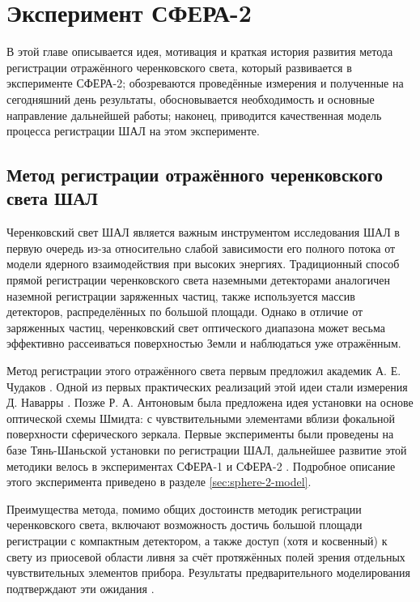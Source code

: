 \chapter{Эксперимент СФЕРА-2}

В этой главе описывается идея, мотивация и краткая история развития метода регистрации отражённого черенковского света, который развивается в эксперименте СФЕРА-2; обозреваются проведённые измерения и полученные на сегодняшний день результаты, обосновывается необходимость и основные направление дальнейшей работы; наконец, приводится качественная модель процесса регистрации ШАЛ на этом эксперименте.

\section{Метод регистрации отражённого черенковского света ШАЛ}

Черенковский свет ШАЛ является важным инструментом исследования ШАЛ в первую очередь из-за относительно слабой зависимости его полного потока от модели ядерного взаимодействия при высоких энергиях. Традиционный способ прямой регистрации черенковского света наземными детекторами аналогичен наземной регистрации заряженных частиц, также используется массив детекторов, распределённых по большой площади. Однако в отличие от заряженных частиц, черенковский свет оптического диапазона может весьма эффективно рассеиваться поверхностью Земли и наблюдаться уже отражённым.

Метод регистрации этого отражённого света первым предложил академик А. Е. Чудаков \cite{Чудаков1972}. Одной из первых практических реализаций этой идеи стали измерения Д. Наварры \cite{Navarra1981}. Позже Р. А. Антоновым была предложена идея установки на основе оптической схемы Шмидта: с чувствительными элементами вблизи фокальной поверхности сферического зеркала. Первые эксперименты были проведены на базе Тянь-Шаньской установки по регистрации ШАЛ, дальнейшее развитие этой методики велось в экспериментах СФЕРА-1 и СФЕРА-2 \cite{Antonov1997, Antonov2001}. Подробное описание этого эксперимента приведено в разделе \ref{sec:sphere-2-model}.

Преимущества метода, помимо общих достоинств методик регистрации черенковского света, включают возможность достичь большой площади регистрации с компактным детектором, а также доступ (хотя и косвенный) к свету из приосевой области ливня за счёт протяжённых полей зрения отдельных чувствительных элементов прибора. Результаты предварительного моделирования подтверждают эти ожидания \cite{Anokhina2007}.


